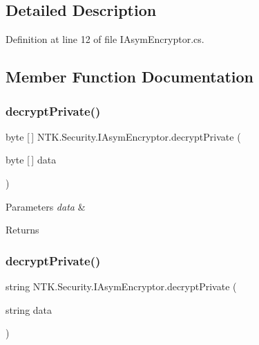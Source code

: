 \subsection{Detailed Description}




Definition at line 12 of file I\+Asym\+Encryptor.\+cs.



\subsection{Member Function Documentation}
\mbox{\label{interface_n_t_k_1_1_security_1_1_i_asym_encryptor_a9a78aebff4cc46081891188c1058b125}} 
\subsubsection{\texorpdfstring{decryptPrivate()}{decryptPrivate()}\hspace{0.1cm}{\footnotesize\ttfamily [1/2]}}
{\footnotesize\ttfamily byte \mbox{[}$\,$\mbox{]} N\+T\+K.\+Security.\+I\+Asym\+Encryptor.\+decrypt\+Private (\begin{DoxyParamCaption}\item[{byte \mbox{[}$\,$\mbox{]}}]{data }\end{DoxyParamCaption})}






\begin{DoxyParams}{Parameters}
{\em data} & \\
\hline
\end{DoxyParams}
\begin{DoxyReturn}{Returns}

\end{DoxyReturn}
\mbox{\label{interface_n_t_k_1_1_security_1_1_i_asym_encryptor_a79aeecc1982b5a6fb6beb187533f3df8}} 
\subsubsection{\texorpdfstring{decryptPrivate()}{decryptPrivate()}\hspace{0.1cm}{\footnotesize\ttfamily [2/2]}}
{\footnotesize\ttfamily string N\+T\+K.\+Security.\+I\+Asym\+Encryptor.\+decrypt\+Private (\begin{DoxyParamCaption}\item[{string}]{data }\end{DoxyParamCaption})}






